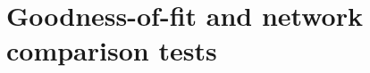 \documentclass[8pt]{beamer}
\begin{document}
\section{Goodness-of-fit and network comparison tests}
% 
% 
%   
% 
%   
% 
\end{document}
